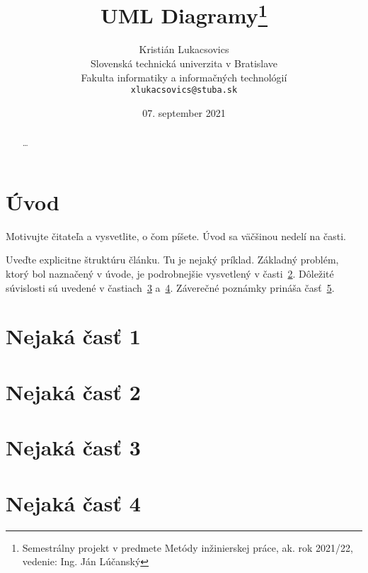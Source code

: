 \documentclass[10pt,twoside,slovak,a4paper]{article}
\title{UML Diagramy\thanks{Semestrálny projekt v predmete Metódy inžinierskej práce, ak. rok 2021/22, vedenie: Ing. Ján Lúčanský}} %
\author{Kristián Lukacsovics\\[2pt]
    {\small Slovenská technická univerzita v Bratislave}\\
    {\small Fakulta informatiky a informačných technológií}\\
    {\small \texttt{xlukacsovics@stuba.sk}}
    }
\date{\small 07. september 2021} %
\begin{document}
\maketitle

\begin{abstract}
\ldots %
\end{abstract}



\section{Úvod}

Motivujte čitateľa a vysvetlite, o čom píšete. Úvod sa väčšinou nedelí na časti.

Uveďte explicitne štruktúru článku. Tu je nejaký príklad.
Základný problém, ktorý bol naznačený v úvode, je podrobnejšie vysvetlený v časti~\ref{nejaka}.
Dôležité súvislosti sú uvedené v častiach~\ref{dolezita} a~\ref{dolezitejsia}.
Záverečné poznámky prináša časť~\ref{zaver}.

\section{Nejaká časť 1} \label{nejaka}
\section{Nejaká časť 2} \label{dolezita}
\section{Nejaká časť 3} \label{dolezitejsia}
\section{Nejaká časť 4} \label{zaver}





\end{document}
